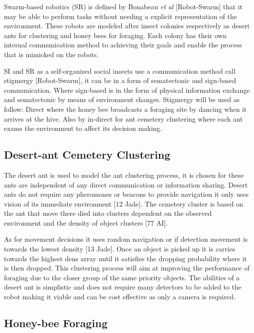 \documentclass[12pt]{article}
\begin{document}
\par{Swarm-based robotics (SR) is defined by Bonabeau \textit{et al} [Robot-Swarm] that it may be able to perform tasks without needing a explicit representation of the environment. These robots are modeled after insect colonies respectively as desert ants for clustering and honey bees for foraging. Each colony has their own internal communication method to achieving their goals and enable the process that is mimicked on the robots.}

\par{SI and SR as a self-organized social insects use a communication method call stigmergy [Robot-Swarm], it can be in a form of sematectonic and sign-based communication. Where sign-based is in the form of physical information exchange and sematectonic by means of environment changes. Stigmergy will be used as follow: Direct where the honey bee broadcasts a foraging site by dancing when it arrives at the hive. Also by in-direct for ant cemetery clustering where each ant exams the environment to affect its decision making.}

\subsection{Desert-ant Cemetery Clustering}

\par{The desert ant is used to model the ant clustering process, it is chosen for these ants are independent of any direct communication or information sharing. Desert ants do not require any pheromones or beacons to provide navigation it only uses vision of its immediate environment [12 Jade]. The cemetery cluster is based on the ant that move there died into clusters dependent on the observed environment and the density of object clusters [77 AI].}

\par{As for movement decisions it uses random navigation or if detection movement is towards the lowest density [13 Jade]. Once an object is picked up it is carries towards the highest dens array until it satisfies the dropping probability where it is then dropped.  This clustering process will aim at improving the performance of foraging due to the closer group of the same priority objects. The abilities of a desert ant is simplistic and does not require many detectors to be added to the robot making it viable and can be cost effective as only a camera is required.}

\subsection{Honey-bee Foraging}
\end{document}
